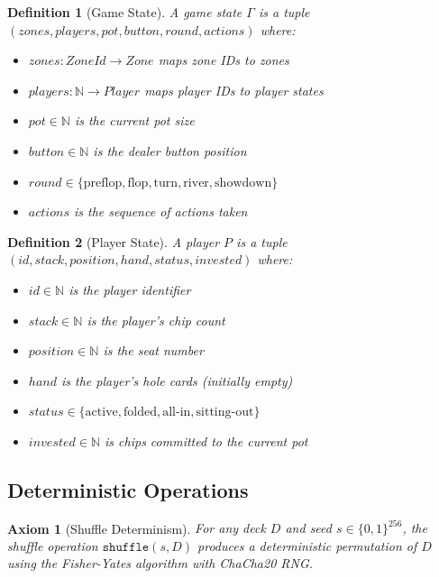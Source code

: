 \documentclass[11pt,a4paper]{article}
\newtheorem{definition}{Definition}[section]
\newtheorem{axiom}{Axiom}[section]
\begin{document}
\begin{definition}[Game State]
\label{def:gamestate}
A game state $\Gamma$ is a tuple $(zones, players, pot, button, round, actions)$ where:
\begin{itemize}
    \item $zones: ZoneId \to Zone$ maps zone IDs to zones
    \item $players: \mathbb{N} \to Player$ maps player IDs to player states
    \item $pot \in \mathbb{N}$ is the current pot size
    \item $button \in \mathbb{N}$ is the dealer button position
    \item $round \in \{\text{preflop}, \text{flop}, \text{turn}, \text{river}, \text{showdown}\}$
    \item $actions$ is the sequence of actions taken
\end{itemize}
\end{definition}

\begin{definition}[Player State]
\label{def:player}
A player $P$ is a tuple $(id, stack, position, hand, status, invested)$ where:
\begin{itemize}
    \item $id \in \mathbb{N}$ is the player identifier
    \item $stack \in \mathbb{N}$ is the player's chip count
    \item $position \in \mathbb{N}$ is the seat number
    \item $hand$ is the player's hole cards (initially empty)
    \item $status \in \{\text{active}, \text{folded}, \text{all-in}, \text{sitting-out}\}$
    \item $invested \in \mathbb{N}$ is chips committed to the current pot
\end{itemize}
\end{definition}

\subsection{Deterministic Operations}

\begin{axiom}[Shuffle Determinism]
\label{ax:shuffle-determinism}
For any deck $D$ and seed $s \in \{0,1\}^{256}$, the shuffle operation $\texttt{shuffle}(s, D)$ produces a deterministic permutation of $D$ using the Fisher-Yates algorithm with ChaCha20 RNG.
\end{axiom}
\end{document}
